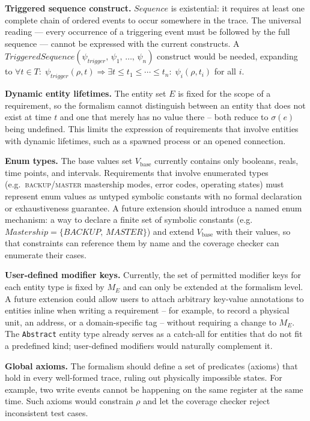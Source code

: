 \textbf{Triggered sequence construct.} $\mathit{Sequence}$ is existential: it requires at least one complete chain of ordered events to occur somewhere in the trace. The universal reading --- every occurrence of a triggering event must be followed by the full sequence --- cannot be expressed with the current constructs. A $\mathit{TriggeredSequence}(\psi_{\mathit{trigger}},\, \psi_1,\, \ldots,\, \psi_n)$ construct would be needed, expanding to $\forall t \in T:\; \psi_{\mathit{trigger}}(\rho, t) \Rightarrow \exists t \leq t_1 \leq \cdots \leq t_n:\; \psi_i(\rho, t_i)$ for all $i$.

\textbf{Dynamic entity lifetimes.} The entity set $E$ is fixed for the scope of a requirement, so the formalism cannot distinguish between an entity that does not exist at time $t$ and one that merely has no value there -- both reduce to $\sigma(e)$ being undefined. This limits the expression of requirements that involve entities with dynamic lifetimes, such as a spawned process or an opened connection.

\textbf{Enum types.} The base values set $V_{\text{base}}$ currently contains only booleans, reals, time points, and intervals. Requirements that involve enumerated types (e.g.\ \textsc{backup}/\textsc{master} mastership modes, error codes, operating states) must represent enum values as untyped symbolic constants with no formal declaration or exhaustiveness guarantee. A future extension should introduce a named enum mechanism: a way to declare a finite set of symbolic constants (e.g.\ $\mathit{Mastership} = \{\mathit{BACKUP},\, \mathit{MASTER}\}$) and extend $V_{\text{base}}$ with their values, so that constraints can reference them by name and the coverage checker can enumerate their cases.

\textbf{User-defined modifier keys.} Currently, the set of permitted modifier keys for each entity type is fixed by $M_E$ and can only be extended at the formalism level. A future extension could allow users to attach arbitrary key-value annotations to entities inline when writing a requirement -- for example, to record a physical unit, an address, or a domain-specific tag -- without requiring a change to $M_E$. The \texttt{Abstract} entity type already serves as a catch-all for entities that do not fit a predefined kind; user-defined modifiers would naturally complement it.

\textbf{Global axioms.} The formalism should define a set of predicates (axioms) that hold in every well-formed trace, ruling out physically impossible states. For example, two write events cannot be happening on the same register at the same time. Such axioms would constrain $\rho$ and let the coverage checker reject inconsistent test cases.

